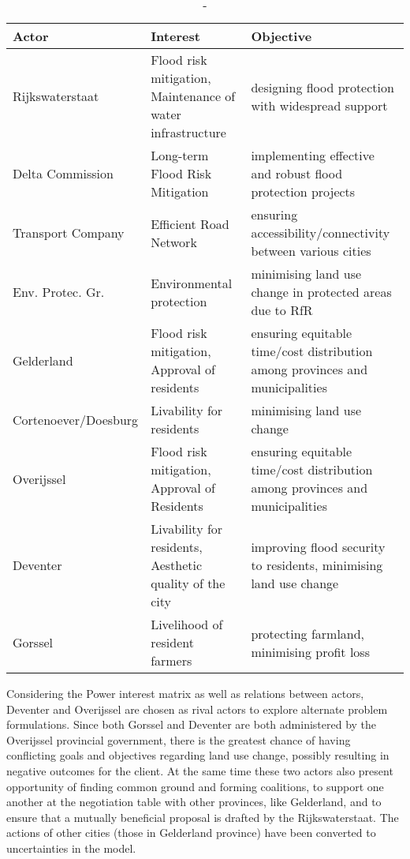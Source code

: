 \begin{table}[h!]
\caption{-}
\begin{tabular}{p{}p{}p{}}
\hline 
Actor & Interest & Objective \\ \hline
Rijkswaterstaat         & Flood risk mitigation, Maintenance of water infrastructure & designing flood protection with widespread support \\ 
Delta Commission        & Long-term Flood Risk Mitigation & implementing effective and robust flood protection projects \\
Transport Company       & Efficient Road Network & ensuring accessibility/connectivity between various cities \\
Env. Protec. Gr.        & Environmental protection & minimising land use change in protected areas due to RfR \\
Gelderland              & Flood risk mitigation, Approval of residents & ensuring equitable time/cost distribution among provinces and municipalities \\
Cortenoever/Doesburg    & Livability for residents & minimising land use change \\
Overijssel              & Flood risk mitigation, Approval of Residents & ensuring equitable time/cost distribution among provinces and municipalities \\
Deventer                & Livability for residents, Aesthetic quality of the city & improving flood security to residents, minimising land use change \\
Gorssel                & Livelihood of resident farmers & protecting farmland, minimising profit loss \\
\end{tabular}
\label{t:actortable}
\end{table}

Considering the Power interest matrix as well as relations between actors, Deventer and Overijssel are chosen as rival actors to explore alternate problem formulations. Since both Gorssel and Deventer are both administered by the Overijssel provincial government, there is the greatest chance of having conflicting goals and objectives regarding land use change, possibly resulting in negative outcomes for the client. At the same time these two actors also present opportunity of finding common ground and forming coalitions, to support one another at the negotiation table with other provinces, like Gelderland, and to ensure that a mutually beneficial proposal is drafted by the Rijkswaterstaat. The actions of other cities (those in Gelderland province) have been converted to uncertainties in the model.

